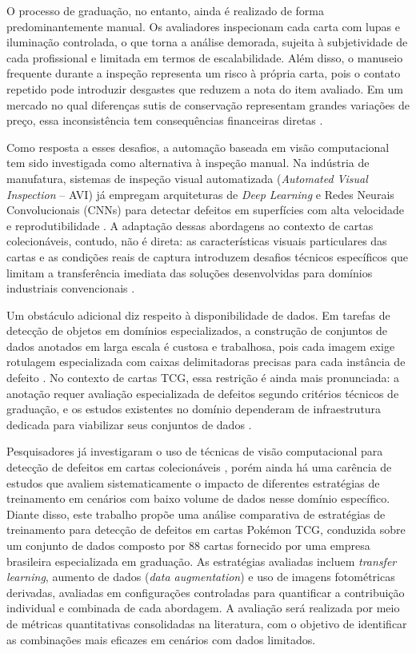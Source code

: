 \documentclass[
    12pt,                %
    openright,           %
    oneside,             %
    a4paper,             %
    english,             %
    brazil               %
]{abntex2}
\begin{document}
O processo de graduação, no entanto, ainda é realizado de forma 
predominantemente manual. Os avaliadores inspecionam cada carta com 
lupas e iluminação controlada, o que torna a análise demorada, sujeita 
à subjetividade de cada profissional e limitada em termos de 
escalabilidade. Além disso, o manuseio frequente durante a inspeção 
representa um risco à própria carta, pois o contato repetido pode 
introduzir desgastes que reduzem a nota do item avaliado. Em um 
mercado no qual diferenças sutis de conservação representam grandes 
variações de preço, essa inconsistência tem consequências financeiras 
diretas \cite{Nahar2025}.

Como resposta a esses desafios, a automação baseada em visão 
computacional tem sido investigada como alternativa à inspeção manual. 
Na indústria de manufatura, sistemas de inspeção visual automatizada 
(\textit{Automated Visual Inspection} -- AVI) já empregam arquiteturas 
de \textit{Deep Learning} e Redes Neurais Convolucionais (CNNs) para 
detectar defeitos em superfícies com alta velocidade e reprodutibilidade 
\cite{Zheng2021}. A adaptação dessas abordagens ao contexto de cartas 
colecionáveis, contudo, não é direta: as características visuais 
particulares das cartas e as condições reais de captura introduzem 
desafios técnicos específicos que limitam a transferência imediata 
das soluções desenvolvidas para domínios industriais convencionais 
\cite{Nahar2025}.

Um obstáculo adicional diz respeito à disponibilidade de dados. Em 
tarefas de detecção de objetos em domínios especializados, a construção 
de conjuntos de dados anotados em larga escala é custosa e trabalhosa, 
pois cada imagem exige rotulagem especializada com caixas delimitadoras 
precisas para cada instância de defeito \cite{Situ2023}. No contexto de cartas TCG, 
essa restrição é ainda mais pronunciada: a anotação requer avaliação especializada 
de defeitos segundo critérios técnicos de graduação, e os estudos existentes no domínio dependeram 
de infraestrutura dedicada para viabilizar seus conjuntos de dados 
\cite{Nahar2025}.

Pesquisadores já investigaram o uso de técnicas de visão computacional 
para detecção de defeitos em cartas colecionáveis \cite{Nahar2025}, porém ainda há uma carência de estudos que avaliem 
sistematicamente o impacto de diferentes estratégias de treinamento em 
cenários com baixo volume de dados nesse domínio específico. Diante 
disso, este trabalho propõe uma análise comparativa de estratégias de 
treinamento para detecção de defeitos em cartas Pokémon TCG, conduzida 
sobre um conjunto de dados composto por 88 cartas fornecido por uma 
empresa brasileira especializada em graduação. As estratégias avaliadas 
incluem \textit{transfer learning}, aumento de dados 
(\textit{data augmentation}) e uso de imagens fotométricas derivadas, 
avaliadas em configurações controladas para quantificar
a contribuição individual e combinada de cada abordagem. A avaliação será realizada por meio de métricas 
quantitativas consolidadas na literatura, com o objetivo de identificar 
as combinações mais eficazes em cenários com dados limitados.
\end{document}
